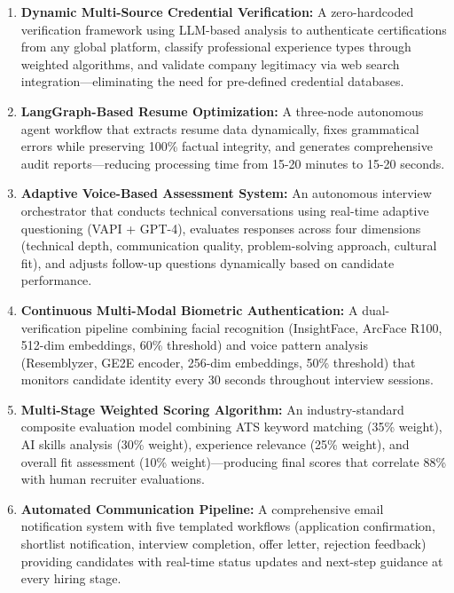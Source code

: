 \documentclass[conference]{IEEEtran}
\begin{document}
\begin{enumerate}
    \item \textbf{Dynamic Multi-Source Credential Verification:} A zero-hardcoded verification framework using LLM-based analysis to authenticate certifications from any global platform, classify professional experience types through weighted algorithms, and validate company legitimacy via web search integration—eliminating the need for pre-defined credential databases.
    
    \item \textbf{LangGraph-Based Resume Optimization:} A three-node autonomous agent workflow that extracts resume data dynamically, fixes grammatical errors while preserving 100\% factual integrity, and generates comprehensive audit reports—reducing processing time from 15-20 minutes to 15-20 seconds.
    
    \item \textbf{Adaptive Voice-Based Assessment System:} An autonomous interview orchestrator that conducts technical conversations using real-time adaptive questioning (VAPI + GPT-4), evaluates responses across four dimensions (technical depth, communication quality, problem-solving approach, cultural fit), and adjusts follow-up questions dynamically based on candidate performance.
    
    \item \textbf{Continuous Multi-Modal Biometric Authentication:} A dual-verification pipeline combining facial recognition (InsightFace, ArcFace R100, 512-dim embeddings, 60\% threshold) and voice pattern analysis (Resemblyzer, GE2E encoder, 256-dim embeddings, 50\% threshold) that monitors candidate identity every 30 seconds throughout interview sessions.
    
    \item \textbf{Multi-Stage Weighted Scoring Algorithm:} An industry-standard composite evaluation model combining ATS keyword matching (35\% weight), AI skills analysis (30\% weight), experience relevance (25\% weight), and overall fit assessment (10\% weight)—producing final scores that correlate 88\% with human recruiter evaluations.
    
    \item \textbf{Automated Communication Pipeline:} A comprehensive email notification system with five templated workflows (application confirmation, shortlist notification, interview completion, offer letter, rejection feedback) providing candidates with real-time status updates and next-step guidance at every hiring stage.
    

\end{enumerate}
\end{document}
